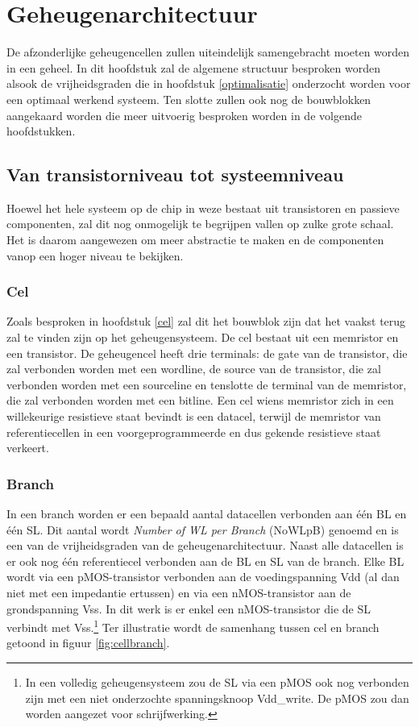 \chapter{Geheugenarchitectuur}
\label{architectuur}
De afzonderlijke geheugencellen zullen uiteindelijk samengebracht moeten worden in een geheel.
In dit hoofdstuk zal de algemene structuur besproken worden alsook de vrijheidsgraden die in hoofdstuk \ref{optimalisatie} onderzocht worden voor een optimaal werkend systeem. Ten slotte zullen ook nog de bouwblokken aangekaard worden die meer uitvoerig besproken worden in de volgende hoofdstukken. 

\section{Van transistorniveau tot systeemniveau}
Hoewel het hele systeem op de chip in weze bestaat uit transistoren en passieve componenten, zal dit nog onmogelijk te begrijpen vallen op zulke grote schaal.
Het is daarom aangewezen om meer abstractie te maken en de componenten vanop een hoger niveau te bekijken.

\subsection{Cel}
Zoals besproken in hoofdstuk \ref{cel} zal dit het bouwblok zijn dat het vaakst terug zal te vinden zijn op het geheugensysteem.
De cel bestaat uit een memristor en een transistor. De geheugencel heeft drie terminals: de gate van de transistor, die zal verbonden worden met een wordline, de source van de transistor, die zal verbonden worden met een sourceline en tenslotte de terminal van de memristor, die zal verbonden worden met een bitline.
Een cel wiens memristor zich in een willekeurige resistieve staat bevindt is een datacel, terwijl de memristor van referentiecellen in een voorgeprogrammeerde en dus gekende resistieve staat verkeert.

\subsection{Branch}
In een branch worden er een bepaald aantal datacellen verbonden aan één BL en één SL. Dit aantal wordt \emph{Number of WL per Branch} (NoWLpB) genoemd en is een van de vrijheidsgraden van de geheugenarchitectuur. Naast alle datacellen is er ook nog één referentiecel verbonden aan de BL en SL van de branch.
Elke BL wordt via een pMOS-transistor verbonden aan de voedingspanning Vdd (al dan niet met een impedantie ertussen) en via een nMOS-transistor aan de grondspanning Vss. In dit werk is er enkel een nMOS-transistor die de SL verbindt met Vss.\footnote{In een volledig geheugensysteem zou de SL via een pMOS ook nog verbonden zijn met een niet onderzochte spanningsknoop Vdd\_write. De pMOS zou dan worden aangezet voor schrijfwerking.}
Ter illustratie wordt de samenhang tussen cel en branch getoond in figuur \ref{fig:cellbranch}.

